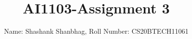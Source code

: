 \documentclass[journal,12pt,twocolumn]{IEEEtran}
\DeclareMathOperator*{\Res}{Res}
\begin{document}
\newcommand{\BEQA}{\begin{eqnarray}}
\newcommand{\EEQA}{\end{eqnarray}}
\newcommand{\define}{\stackrel{\triangle}{=}}

\raggedbottom
\setlength{\parindent}{0pt}
\providecommand{\mbf}{\mathbf}
\providecommand{\pr}[1]{\ensuremath{\Pr\left(#1\right)}}
\providecommand{\qfunc}[1]{\ensuremath{Q\left(#1\right)}}
\providecommand{\sbrak}[1]{\ensuremath{{}\left[#1\right]}}
\providecommand{\lsbrak}[1]{\ensuremath{{}\left[#1\right.}}
\providecommand{\rsbrak}[1]{\ensuremath{{}\left.#1\right]}}
\providecommand{\brak}[1]{\ensuremath{\left(#1\right)}}
\providecommand{\lbrak}[1]{\ensuremath{\left(#1\right.}}
\providecommand{\rbrak}[1]{\ensuremath{\left.#1\right)}}
\providecommand{\cbrak}[1]{\ensuremath{\left\{#1\right\}}}
\providecommand{\lcbrak}[1]{\ensuremath{\left\{#1\right.}}
\providecommand{\rcbrak}[1]{\ensuremath{\left.#1\right\}}}
\theoremstyle{remark}
\newtheorem{rem}{Remark}
\newcommand{\sgn}{\mathop{\mathrm{sgn}}}
\providecommand{\abs}[1]{\vert#1\vert}
\providecommand{\res}[1]{\Res\displaylimits_{#1}} 
\providecommand{\norm}[1]{\lVert#1\rVert}
\providecommand{\mtx}[1]{\mathbf{#1}}
\providecommand{\mean}[1]{E[ #1 ]}
\providecommand{\fourier}{\overset{\mathcal{F}}{ \rightleftharpoons}}
\providecommand{\system}{\overset{\mathcal{H}}{ \longleftrightarrow}}
\newcommand{\solution}{\noindent \textbf{Solution: }}
\newcommand{\cosec}{\,\text{cosec}\,}
\providecommand{\dec}[2]{\ensuremath{\overset{#1}{\underset{#2}{\gtrless}}}}
\newcommand{\myvec}[1]{\ensuremath{\begin{pmatrix}#1\end{pmatrix}}}
\newcommand{\mydet}[1]{\ensuremath{\begin{vmatrix}#1\end{vmatrix}}}
\makeatletter
{}
\makeatother
\let\StandardTheFigure\thefigure
\let\vec\mathbf
\renewcommand{\thefigure}{\theproblem}
\def\putbox#1#2#3{\makebox[0in][l]{\makebox[#1][l]{}\raisebox{\baselineskip}[0in][0in]{\raisebox{#2}[0in][0in]{#3}}}}
     \def\rightbox#1{\makebox[0in][r]{#1}}
     \def\centbox#1{\makebox[0in]{#1}}
     \def\topbox#1{\raisebox{-\baselineskip}[0in][0in]{#1}}
     \def\midbox#1{\raisebox{-0.5\baselineskip}[0in][0in]{#1}}
\vspace{3cm}
\title{\textbf{AI1103-Assignment 3}}
\author{Name: Shashank Shanbhag, Roll Number: CS20BTECH11061 }
\maketitle
\newpage
\bigskip
\renewcommand{\thefigure}{\theenumi}
\renewcommand{\thetable}{\theenumi}
\end{document}
